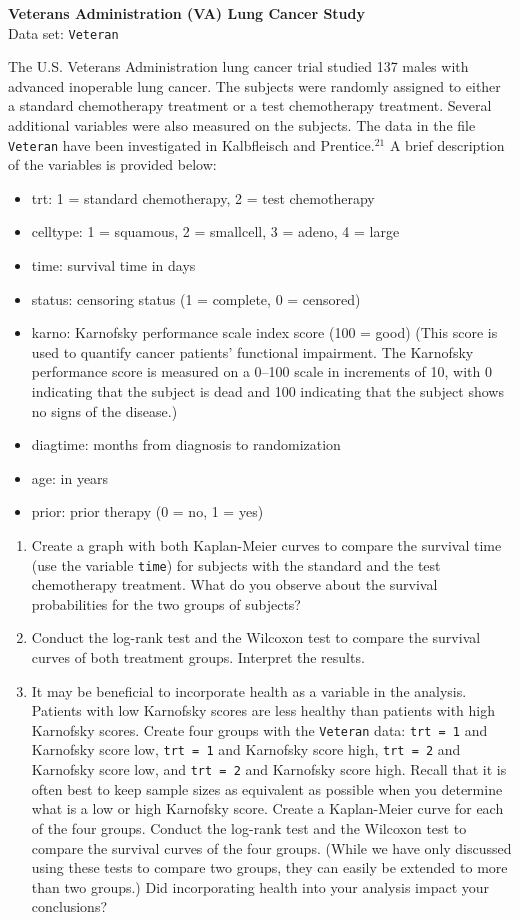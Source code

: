 \documentclass[
]{report}
\begin{document}
\begin{list}{E.}{ \setlength{\itemsep}{1.2em}}
  \item \textbf{Veterans Administration (VA) Lung Cancer Study}\\
  Data set: \texttt{Veteran}

The U.S. Veterans Administration lung cancer trial studied 137 males with advanced inoperable lung cancer. The subjects were randomly assigned to either a standard chemotherapy treatment or a test chemotherapy treatment. Several additional variables were also measured on the subjects. The data in the file \texttt{Veteran} have been investigated in Kalbfleisch and Prentice.$^{21}$ A brief description of the variables is provided below:
\begin{itemize}
  \item trt: 1 = standard chemotherapy, 2 = test chemotherapy
  \item celltype: 1 = squamous, 2 = smallcell, 3 = adeno, 4 = large
  \item time: survival time in days
  \item status: censoring status (1 = complete, 0 = censored)
  \item karno: Karnofsky performance scale index score (100 = good) (This score is used to quantify cancer patients’ functional impairment. The Karnofsky performance score is measured on a 0–100 scale in increments of 10, with 0 indicating that the subject is dead and 100 indicating that the subject shows no signs of the disease.)
  \item diagtime: months from diagnosis to randomization
  \item age: in years
  \item prior: prior therapy (0 = no, 1 = yes)
\end{itemize}
  \begin{enumerate}
    \item Create a graph with both Kaplan-Meier curves to compare the survival time (use the variable \texttt{time}) for subjects with the standard and the test chemotherapy treatment. What do you observe about the survival probabilities for the two groups of subjects?
    \item Conduct the log-rank test and the Wilcoxon test to compare the survival curves of both treatment groups. Interpret the results.
    \item It may be beneficial to incorporate health as a variable in the analysis. Patients with low Karnofsky scores are less healthy than patients with high Karnofsky scores. Create four groups with the \texttt{Veteran} data: \texttt{trt = 1} and Karnofsky score low, \texttt{trt = 1} and Karnofsky score high, \texttt{trt = 2} and Karnofsky score low, and \texttt{trt = 2} and Karnofsky score high. Recall that it is often best to keep sample sizes as equivalent as possible when you determine what is a low or high Karnofsky score. Create a Kaplan-Meier curve for each of the four groups. Conduct the log-rank test and the Wilcoxon test to compare the survival curves of the four groups. (While we have only discussed using these tests to compare two groups, they can easily be extended to more than two groups.) Did incorporating health into your analysis impact your conclusions?

\end{enumerate}
\end{list}
\end{document}
